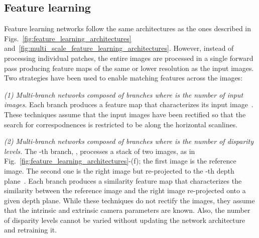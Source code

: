\documentclass[10pt,journal,compsoc]{IEEEtran}
\newcommand{\noi}{\noindent}
\begin{document}
\subsection{Feature learning}
\label{sec:end_to_end_featurelearning}

Feature learning networks follow the same architectures as the ones described in Figs.~\ref{fig:feature_learning_architectures} and~\ref{fig:multi_scale_feature_learning_architectures}. However, instead of processing individual patches, the entire images are processed in a single forward pass producing feature maps of the same or lower resolution as the input images.  Two strategies have been used to enable  matching features across the images:

\vspace{6pt}
\noi \textit{(1) Multi-branch networks composed of  branches where  is the number of input images}. Each branch produces a feature map that characterizes its input image~\cite{mayer2016large,kar2017learning,kendall2017end,pang2017cascade,liang2018learning,chang2018pyramid,nie2019multi}. These techniques assume that the input images have been rectified so that the search for correspodnences is restricted to be along the horizontal scanlines.  
	
\vspace{6pt}
\noi  \textit{(2) Multi-branch networks composed of  branches where  is the number of disparity levels.}  The -th  branch, , processes a stack of two images, as in Fig.~\ref{fig:feature_learning_architectures}-(f); the first image is the reference image. The second one is the right image but re-projected to the -th depth plane~\cite{flynn2016deepstereo}. Each branch produces a similarity feature map that characterizes the similarity between the reference image and the right image re-projected onto a given depth plane. 	While these techniques do not rectify the images, they assume that the intrinsic and extrinsic camera parameters are known. Also, the number of disparity levels cannot be varied without updating the network architecture and  retraining it.
\end{document}
